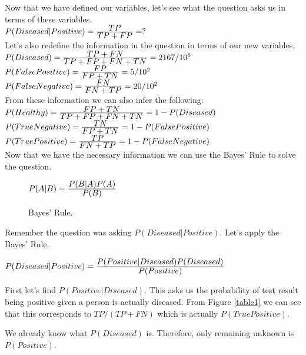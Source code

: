 \documentclass[12pt]{article}
\begin{document}
Now that we have defined our variables, 
let's see what the question asks us in terms of these variables. \\

$P(Diseased|Positive) = \frac{\displaystyle TP}{\displaystyle TP + FP} = ?$ \\


Let's also redefine the information in the question in terms of our new variables. \\


\(P(Diseased) = \frac{\displaystyle TP + FN}{\displaystyle TP + FP + FN + TN} = 2167/10^{6}\) \\

\(P(False Positive) = \frac{\displaystyle FP}{\displaystyle FP + TN} = 5/10^{2}\) \\

\(P(False Negative) = \frac{\displaystyle FN}{\displaystyle FN + TP} = 20/10^{2}\) \\

\pagebreak
From these information we can also infer the following: \\

\(P(Healthy) = \frac{\displaystyle FP + TN}{\displaystyle TP + FP + FN + TN} = 1 - P(Diseased)\) \\

\(P(True Negative) = \frac{\displaystyle TN}{\displaystyle FP + TN} = 1 - P(False Positive)\) \\

\(P(True Positive) = \frac{\displaystyle TP}{\displaystyle FN + TP} = 1 - P(False Negative)\) \\

Now that we have the necessary information we can use the Bayes' Rule to solve the question.

\begin{figure}[h]
    \centering
        $ P(A|B)=\frac{\displaystyle P(B|A)P(A)}{\displaystyle P(B)}$
    \caption{Bayes' Rule.}
    \label{bayesrule}
\end{figure}

Remember the question was asking $P(Diseased|Positive)$. Let's apply the Bayes' Rule. 

\begin{center}
    $ P(Diseased|Positive)=\frac{\displaystyle P(Positive|Diseased)P(Diseased)}{\displaystyle P(Positive)}$
\end{center}

First let's find $P(Positive|Diseased)$. 
This asks us the probability of test result being positive 
given a person is actually diseased. 
From Figure \ref{table1} we can see that this corresponds to $TP /(TP + FN)$ which is actually $P(True Positive)$.

We already know what $P(Diseased)$ is. 
Therefore, only remaining unknown is $P(Positive)$.
\end{document}
